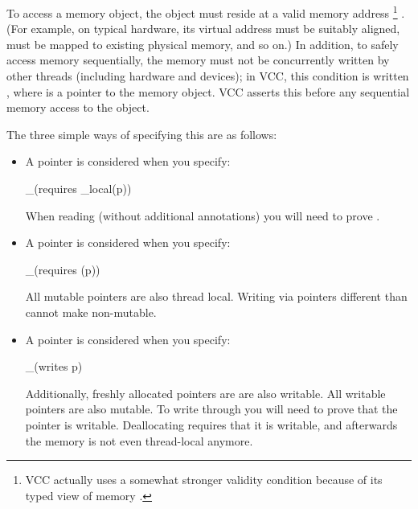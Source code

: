 To access a memory object, the object must reside at a valid memory address%
\footnote{VCC actually uses a somewhat stronger validity condition because of 
its typed view of memory .
}%
. (For example, on typical hardware, its virtual address must be suitably aligned,
must be mapped to existing physical memory, and so on.) 
In addition, to safely access memory sequentially, the memory must not be concurrently
written by other threads (including hardware and devices); in VCC, this condition is written
, where  is a pointer to the memory object. VCC asserts this 
before any sequential memory access to the object. 

The three simple ways of specifying this are as follows:

\begin{itemize}
\item A pointer  is considered 
when you specify:
\begin{VCC}
_(requires \thread_local(p))
\end{VCC}
When reading  (without additional annotations) you will need to prove .

\item A pointer  is considered  when you specify:
\begin{VCC}
_(requires \mutable(p))
\end{VCC}
All mutable pointers are also thread local.
Writing via pointers different than  cannot make  non-mutable.

\item A pointer  is considered  when you specify:
\begin{VCC}
_(writes p)
\end{VCC}
Additionally, freshly allocated pointers are are also writable.
All writable pointers are also mutable.
To write through  you will need to prove that the pointer is writable.
Deallocating  requires that it is writable, and afterwards
the memory is not even thread-local anymore.
\end{itemize}

